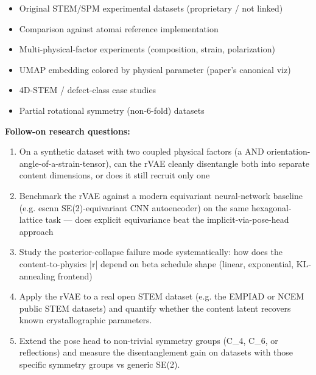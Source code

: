 \documentclass[11pt]{article}
\begin{document}
\begin{itemize}[leftmargin=1.4em,itemsep=0.2em,topsep=0.2em]
\item Original STEM/SPM experimental datasets (proprietary / not linked)
\item Comparison against atomai reference implementation
\item Multi-physical-factor experiments (composition, strain, polarization)
\item UMAP embedding colored by physical parameter (paper's canonical viz)
\item 4D-STEM / defect-class case studies
\item Partial rotational symmetry (non-6-fold) datasets
\end{itemize}\noindent\textbf{Follow-on research questions:}
\begin{enumerate}[leftmargin=1.6em,itemsep=0.2em,topsep=0.2em,label=Q\arabic*.]
\item On a synthetic dataset with two coupled physical factors (a AND orientation-angle-of-a-strain-tensor), can the rVAE cleanly disentangle both into separate content dimensions, or does it still recruit only one
\item Benchmark the rVAE against a modern equivariant neural-network baseline (e.g. escnn SE(2)-equivariant CNN autoencoder) on the same hexagonal-lattice task --- does explicit equivariance beat the implicit-via-pose-head approach
\item Study the posterior-collapse failure mode systematically: how does the content-to-physics |r| depend on beta schedule shape (linear, exponential, KL-annealing frontend)
\item Apply the rVAE to a real open STEM dataset (e.g. the EMPIAD or NCEM public STEM datasets) and quantify whether the content latent recovers known crystallographic parameters.
\item Extend the pose head to non-trivial symmetry groups (C\_4, C\_6, or reflections) and measure the disentanglement gain on datasets with those specific symmetry groups vs generic SE(2).
\end{enumerate}
\end{document}
